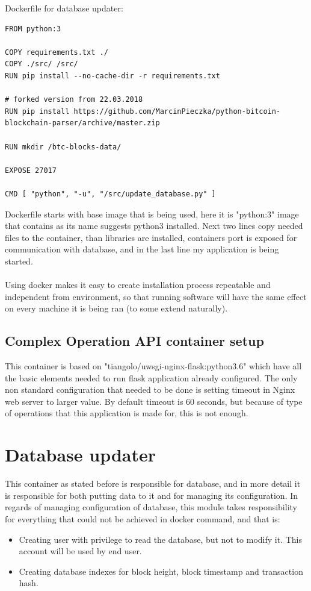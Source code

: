 \documentclass[12pt, en, eng, oneside]{mgr}
\begin{document}
Dockerfile for database updater:
\begin{verbatim}
FROM python:3

COPY requirements.txt ./
COPY ./src/ /src/
RUN pip install --no-cache-dir -r requirements.txt

# forked version from 22.03.2018
RUN pip install https://github.com/MarcinPieczka/python-bitcoin-blockchain-parser/archive/master.zip

RUN mkdir /btc-blocks-data/

EXPOSE 27017

CMD [ "python", "-u", "/src/update_database.py" ]
\end{verbatim}

Dockerfile starts with base image that is being used, here it is "python:3" image that contains as its name suggests python3 installed.
Next two lines copy needed files to the container, than libraries are installed, containers port is exposed for communication with database, and in the last line my application is being started.
\\
\\
Using docker makes it easy to create installation process repeatable and independent from environment, so that running software will have the same effect on every machine it is being ran (to some extend naturally). 

\subsection{Complex Operation API container setup}
This container is based on "tiangolo/uwsgi-nginx-flask:python3.6" which have all the basic elements needed to run flask application already configured. The only non standard configuration that needed to be done is setting timeout in Nginx web server to larger value. By default timeout is 60 seconds, but because of type of operations that this application is made for, this is not enough.  

\section{Database updater}
This container as stated before is responsible for database, and in more detail it is responsible for both putting data to it and for managing its configuration. In regards of managing configuration of database, this module takes responsibility for everything that could not be achieved in docker command, and that is:

\begin{itemize}
\item
Creating user with privilege to read the database, but not to modify it. This account will be used by end user.
\item
Creating database indexes for block height, block timestamp and transaction hash.
\end{itemize}
\end{document}
